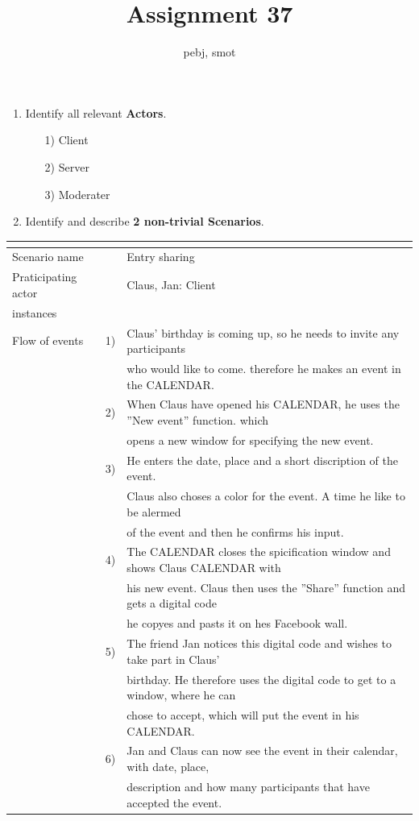 \documentclass{article}
\begin{document}
	\title{Assignment 37}
	\author{pebj, smot}
	\maketitle

	\begin{enumerate}
		\item Identify all relevant \textbf{Actors}.
		\begin{enumerate}
			\item[1)]Client
			\item[2)]Server
			\item[3)]Moderater
		\end{enumerate}
		\item Identify and describe \textbf{2 non-trivial Scenarios}.
	\end{enumerate}

\begin{tabular}{l r @{} l}
	\multicolumn{2}{c}{} \\
	\hline
	Scenario name	&&Entry sharing\\
	\hline
	Praticipating actor	&&Claus, Jan: Client \\
	instances       	&&\\
	\hline
	Flow of events	&1)&Claus' birthday is coming up, so he needs to invite any participants\\ 
					&&who would like to come. therefore he makes an event in the CALENDAR.\\
				&2)&When Claus have opened his CALENDAR, he uses the ''New event'' function. which\\ 
					&&opens a new window for specifying the new event. \\
				&3)&He enters the date, place and a short discription of the event.\\
					&&Claus also choses a color for the event. A time he like to be alermed\\
					&&of the event and then he confirms his input.\\
				&4)&The CALENDAR closes the spicification window and shows Claus CALENDAR with\\
					&&his new event. Claus then uses the ''Share'' function and gets a digital code\\
					&&he copyes and pasts it on hes Facebook wall.\\
				&5)&The friend Jan notices this digital code and wishes to take part in Claus' \\ 
					&&birthday. He therefore uses the digital code to get to a window, where he can\\
					&&chose to accept, which will put the event in his CALENDAR.\\
				&6)&Jan and Claus can now see the event in their calendar, with date, place,\\
					&&description and how many participants that have accepted the event.\\
	\hline
\end{tabular}
\\
\end{document}
